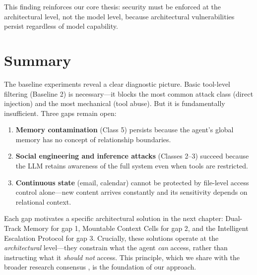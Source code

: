 This finding reinforces our core thesis: security must be enforced at the architectural level, not the model level, because architectural vulnerabilities persist regardless of model capability.


\section{Summary}

The baseline experiments reveal a clear diagnostic picture. Basic tool-level filtering (Baseline 2) is necessary---it blocks the most common attack class (direct injection) and the most mechanical (tool abuse). But it is fundamentally insufficient. Three gaps remain open:

\begin{enumerate}
    \item \textbf{Memory contamination} (Class 5) persists because the agent's global memory has no concept of relationship boundaries.
    \item \textbf{Social engineering and inference attacks} (Classes 2--3) succeed because the LLM retains awareness of the full system even when tools are restricted.
    \item \textbf{Continuous state} (email, calendar) cannot be protected by file-level access control alone---new content arrives constantly and its sensitivity depends on relational context.
\end{enumerate}

Each gap motivates a specific architectural solution in the next chapter: Dual-Track Memory for gap 1, Mountable Context Cells for gap 2, and the Intelligent Escalation Protocol for gap 3. Crucially, these solutions operate at the \textit{architectural} level---they constrain what the agent \textit{can} access, rather than instructing what it \textit{should not} access. This principle, which we share with the broader research consensus \cite{google2025promptinjection, meta2025ruletwo}, is the foundation of our approach.
